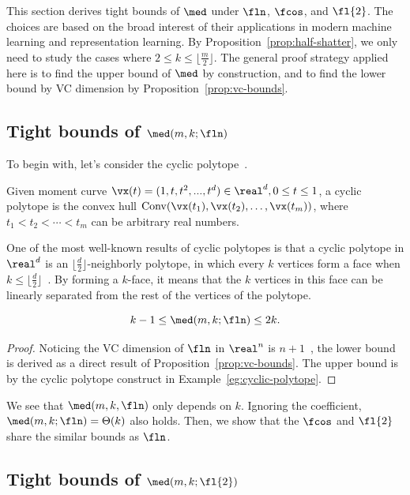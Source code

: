 This section derives tight bounds of $\med$ under $\fln$, $\fcos$, and $\fl{2}$. 
The choices are based on the broad interest of their applications in modern machine learning and representation learning. By Proposition~\ref{prop:half-shatter}, we only need to study the cases where $2\leq k \leq \lfloor \frac{m}{2} \rfloor$. The general proof strategy applied here is to find the upper bound of $\med$ by construction, and to find the lower bound by VC dimension by Proposition~\ref{prop:vc-bounds}.

\subsection{Tight bounds of $\med(m, k;\fln)$}\label{sec:linear-bounds}
To begin with, let's consider the cyclic polytope~\citep{ziegler2012lectures}.
\begin{example}\label{eg:cyclic-polytope}
	Given moment curve $\vx(t) = (1, t, t^2, ..., t^d)\in \real^d, 0\leq t\leq 1$, a cyclic polytope is the convex hull ${\rm Conv}(\vx(t_1), \vx(t_2), \dots, \vx(t_m))$, where $t_1 < t_2 < \cdots < t_m$ can be arbitrary real numbers.
\end{example}
One of the most well-known results of cyclic polytopes is that a cyclic polytope in $\real^d$ is an $\lfloor \frac{d}{2} \rfloor$-neighborly polytope, in which every $k$ vertices form a face when $k\leq \lfloor \frac{d}{2} \rfloor$~\citep{ziegler2012lectures}. By forming a $k$-face, it means that the $k$ vertices in this face can be linearly separated from the rest of the vertices of the polytope.

\begin{theorem}\label{thm:linear-lower-upper}
    $$k-1\leq \med(m, k; \fln) \leq 2k.$$
\end{theorem}
\begin{proof}
Noticing the VC dimension of $\fln$ in $\real^n$ is $n+1$~\citep{mohri2018foundations}, the lower bound is derived as a direct result of Proposition~\ref{prop:vc-bounds}. The upper bound is by the cyclic polytope construct in Example~\ref{eg:cyclic-polytope}.
\end{proof}

We see that $\med(m, k, \fln)$ only depends on $k$. Ignoring the coefficient, $\med(m, k; \fln) = \Theta(k)$ also holds. Then, we show that the $\fcos$ and $\fl{2}$ share the similar bounds as $\fln$.

\subsection{Tight bounds of $\med(m, k;\fl{2})$}~\label{sec:generalize_linear}

